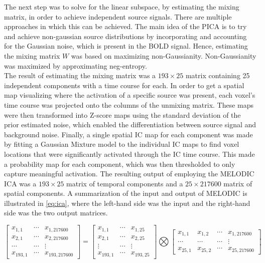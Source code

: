 The next step was to solve for the linear subspace, by estimating the mixing matrix, in order to achieve independent source signals. There are multiple approaches in which this can be achieved. The main idea of the PICA is to try and achieve non-gaussian source distributions by incorporating and accounting for the Gaussian noise, which is present in the BOLD signal. Hence, estimating the mixing matrix $W$ was based on maximizing non-Gaussianity. Non-Gaussianity was maximized by approximating neg-entropy. \\
The result of estimating the mixing matrix was a $193 \times 25$ matrix containing 25 independent components with a time course for each. In order to get a spatial map visualizing where the activation of a specific source was present, each voxel's time course was projected onto the columns of the unmixing matrix. These maps were then transformed into Z-score maps using the standard deviation of the prior estimated noise, which enabled the differentiation between source signal and background noise. Finally, a single spatial IC map for each component was made by fitting a Gaussian Mixture model to the individual IC maps to find voxel locations that were significantly activated through the IC time course. This made a probability map for each component, which was then thresholded to only capture meaningful activation. The resulting output of employing the MELODIC ICA was a $193 \times 25$ matrix of temporal components and a $25 \times 217600$ matrix of spatial components. A summarization of the input and output of MELODIC is illustrated in \eqref{eq:ica}, where the left-hand side was the input and the right-hand side was the two output matrices. 
 
\begin{equation} \label{eq:ica}
 \begin{bmatrix}
	x_{1,1}  & \cdots & x_{1,217600} \\
	x_{2,1}  & \cdots & x_{2,217600} \\
	\cdots   & \cdots & \vdots \\
	x_{193,1}& \cdots & x_{193,217600} 
\end{bmatrix}
= 
\begin{bmatrix}
	x_{1,1}  & \cdots & x_{1,25} \\
	x_{2,1}  & \cdots & x_{2,25} \\
	\vdots   & \cdots & \vdots \\
	x_{193,1} & \cdots & x_{193,25} 
\end{bmatrix}
\bigotimes 
\begin{bmatrix}
	x_{1,1} & x_{1,2} & \cdots & x_{1,217600} \\
	\cdots & \cdots & \cdots & \vdots \\
	x_{25,1} & x_{25,2} & \cdots & x_{25,217600} 
\end{bmatrix}
\end{equation}
